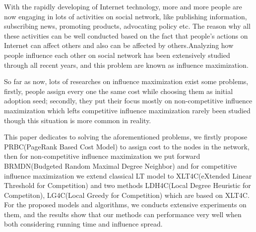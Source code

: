 \begin{eabstract} 
With the rapidly developing of Internet technology, more and more people are now engaging in lots of activities on social network, like publishing information, subscribing news, promoting products, advocating policy etc. The reason why all these activities can be well conducted based on the fact that people's actions on Internet can affect others and also can be affected by others.Analyzing how people influence each other on social network has been extensively studied through all recent years, and this problem are known as influence maximization.


So far as now, lots of researches on influence maximization exist some problems, firstly, people assign every one the same cost while choosing them as initial adoption seed; secondly, they put their focus mostly on non-competitive influence maximization which lefts competitive influence maximization rarely been studied though this situation is more common in reality.


This paper dedicates to solving the aforementioned problems, we firstly propose PRBC(PageRank Based Cost Model) to assign cost to the nodes in the network, then for non-competitive influence maximization we put forward BRMDN(Budgeted Random Maximal Degree Neighbor) and for competitive influence maximization we extend classical LT model to XLT4C(eXtended Linear Threshold for Competition) and two methods LDH4C(Local Degree Heuristic for Competiton), LG4C(Local Greedy for Competition) which are based on XLT4C. For the proposed models and algorithms, we conducts extensive experiments on them, and the results show that our methods can performance very well when both considering running time and influence spread.


\end{eabstract}